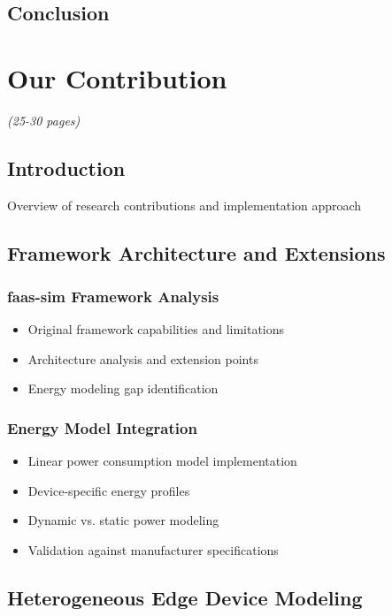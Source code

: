 \documentclass[12pt,a4paper]{report}
\begin{document}
\section{Conclusion}


\chapter{Our Contribution}
\textit{(25-30 pages)}

\section{Introduction}
Overview of research contributions and implementation approach

\section{Framework Architecture and Extensions}

\subsection{faas-sim Framework Analysis}
\begin{itemize}[leftmargin=1cm]
    \item Original framework capabilities and limitations
    \item Architecture analysis and extension points
    \item Energy modeling gap identification
\end{itemize}

\subsection{Energy Model Integration}
\begin{itemize}[leftmargin=1cm]
    \item Linear power consumption model implementation
    \item Device-specific energy profiles
    \item Dynamic vs. static power modeling
    \item Validation against manufacturer specifications
\end{itemize}

\section{Heterogeneous Edge Device Modeling}
\end{document}
